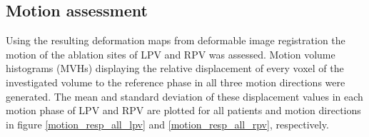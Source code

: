 \documentclass[type=dr, dr=rernat, accentcolor=tud7b,colorbacktitle, bigchapter, openright, twoside, 12pt ]{tudthesis}
\begin{document}

\vspace*{-0.6cm}

\subsection{Motion assessment}
\label{motion}
Using the resulting deformation maps from deformable image registration the motion of the ablation sites of LPV and RPV was assessed. Motion volume histograms (MVHs) 
displaying the relative displacement of every voxel of the investigated volume to the reference phase in all three motion directions 
were generated. The mean and standard deviation of these displacement values in each motion phase of LPV and RPV are plotted for all patients 
and motion directions in figure \ref{motion_resp_all_lpv} and \ref{motion_resp_all_rpv}, respectively.


\vspace*{-0.8cm}
\end{document}
